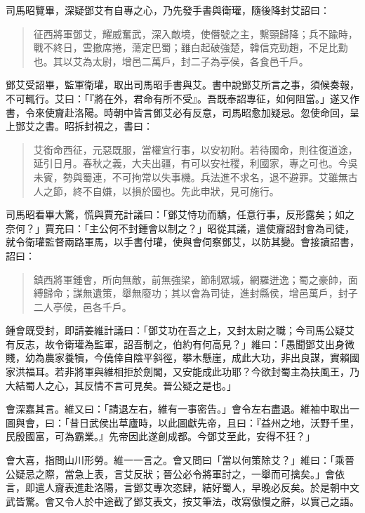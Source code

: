 司馬昭覽畢，深疑鄧艾有自專之心，乃先發手書與衛瓘，隨後降封艾詔曰：

\begin{quote}
征西將軍鄧艾，耀威奮武，深入敵境，使僭號之主，繫頸歸降；兵不踰時，戰不終日，雲撤席捲，蕩定巴蜀；雖白起破強楚，韓信克勁趙，不足比勳也。其以艾為太尉，增邑二萬戶，封二子為亭侯，各食邑千戶。
\end{quote}

鄧艾受詔畢，監軍衛瓘，取出司馬昭手書與艾。書中說鄧艾所言之事，須候奏報，不可輒行。艾曰：「『將在外，君命有所不受』。吾既奉詔專征，如何阻當。」遂又作書，令來使齎赴洛陽。時朝中皆言鄧艾必有反意，司馬昭愈加疑忌。忽使命回，呈上鄧艾之書。昭拆封視之，書曰：

\begin{quote}
艾銜命西征，元惡既服，當權宜行事，以安初附。若待國命，則往復道途，延引日月。春秋之義，大夫出疆，有可以安社稷，利國家，專之可也。今吳未賓，勢與蜀連，不可拘常以失事機。兵法進不求名，退不避罪。艾雖無古人之節，終不自嫌，以損於國也。先此申狀，見可施行。
\end{quote}

司馬昭看畢大驚，慌與賈充計議曰：「鄧艾恃功而驕，任意行事，反形露矣；如之奈何？」賈充曰：「主公何不封鍾會以制之？」昭從其議，遣使齎詔封會為司徒，就令衛瓘監督兩路軍馬，以手書付瓘，使與會伺察鄧艾，以防其變。會接讀詔書，詔曰：

\begin{quote}
鎮西將軍鍾會，所向無敵，前無強梁，節制眾城，網羅迸逸；蜀之豪帥，面縛歸命；謀無遺策，舉無廢功；其以會為司徒，進封縣侯，增邑萬戶，封子二人亭侯，邑各千戶。
\end{quote}

鍾會既受封，即請姜維計議曰：「鄧艾功在吾之上，又封太尉之職；今司馬公疑艾有反志，故令衛瓘為監軍，詔吾制之，伯約有何高見？」維曰：「愚聞鄧艾出身微賤，幼為農家養犢，今僥倖自陰平斜徑，攀木懸崖，成此大功，非出良謀，實賴國家洪福耳。若非將軍與維相拒於劍閣，又安能成此功耶？今欲封蜀主為扶風王，乃大結蜀人之心，其反情不言可見矣。晉公疑之是也。」

會深嘉其言。維又曰：「請退左右，維有一事密告。」會令左右盡退。維袖中取出一圖與會，曰：「昔日武侯出草廬時，以此圖獻先帝，且曰：『益州之地，沃野千里，民殷國富，可為霸業。』先帝因此遂創成都。今鄧艾至此，安得不狂？」

會大喜，指問山川形勞。維一一言之。會又問曰「當以何策除艾？」維曰：「乘晉公疑忌之際，當急上表，言艾反狀；晉公必令將軍討之，一舉而可擒矣。」會依言，即遣人齎表進赴洛陽，言鄧艾專次恣肆，結好蜀人，早晚必反矣。於是朝中文武皆驚。會又令人於中途截了鄧艾表文，按艾筆法，改寫傲慢之辭，以實己之語。

